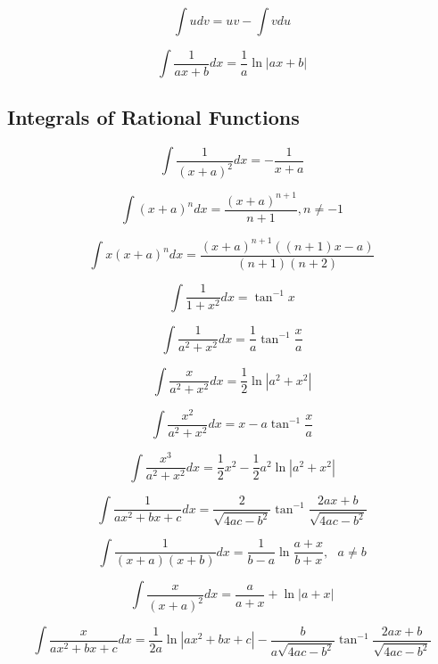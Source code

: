 \documentclass[11pt,epsfig]{article}
\begin{document}
\begin{equation}
\int u dv = uv - \int v du
\end{equation}

\begin{equation}
\int \frac{1}{ax+b}dx = \frac{1}{a} \ln |ax + b| 
\end{equation}

\subsection{Integrals of Rational Functions}

\begin{equation}
\int \frac{1}{(x+a)^2}dx = -\frac{1}{x+a}
\end{equation}

\begin{equation}
\int (x+a)^n dx = \frac{(x+a)^{n+1}}{n+1}, n\ne -1
\end{equation}

\begin{equation}
\int x(x+a)^n dx = \frac{(x+a)^{n+1} ( (n+1)x-a)}{(n+1)(n+2)}
\end{equation}

\begin{equation}
\int \frac{1}{1+x^2}dx = \tan^{-1}x
\end{equation}

\begin{equation}
\int \frac{1}{a^2+x^2}dx = \frac{1}{a}\tan^{-1}\frac{x}{a}
\end{equation}

\begin{equation}
\int \frac{x}{a^2+x^2}dx = \frac{1}{2}\ln|a^2+x^2|
\end{equation}

\begin{equation}
\int \frac{x^2}{a^2+x^2}dx = x-a\tan^{-1}\frac{x}{a}
\end{equation}

\begin{equation}
\int \frac{x^3}{a^2+x^2}dx = \frac{1}{2}x^2-\frac{1}{2}a^2\ln|a^2+x^2|
\end{equation}

\begin{equation}
\int \frac{1}{ax^2+bx+c}dx = \frac{2}{\sqrt{4ac-b^2}}\tan^{-1}\frac{2ax+b}{\sqrt{4ac-b^2}}
\end{equation}

\begin{equation}
\int \frac{1}{(x+a)(x+b)}dx = \frac{1}{b-a}\ln\frac{a+x}{b+x}, \text{ } a\ne b
\end{equation}

\begin{equation}
\int \frac{x}{(x+a)^2}dx = \frac{a}{a+x}+\ln |a+x|
\end{equation}


\begin{equation}
\int \frac{x}{ax^2+bx+c}dx = \frac{1}{2a}\ln|ax^2+bx+c| 
-\frac{b}{a\sqrt{4ac-b^2}}\tan^{-1}\frac{2ax+b}{\sqrt{4ac-b^2}}
\end{equation}
\end{document}
